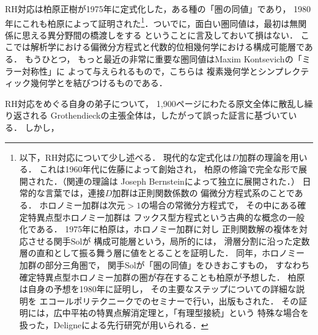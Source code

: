 \documentclass[9pt, a4paper, dvipdfmx]{jlreq}
\theoremstyle{definition}
\theoremstyle{mystyle}
\numberwithin{equation}{section} %
\begin{document}
RH対応は柏原正樹が1975年に定式化した，ある種の「圏の同値」であり，
1980年にこれも柏原によって証明された\footnote[26]{
    以下，RH対応について少し述べる．
    現代的な定式化は\(D\)加群の理論を用いる．
    これは1960年代に佐藤によって創始され，
    柏原の修論で完全な形で展開された．（関連の理論は
    Joseph Bernsteinによって独立に展開された．）
    日常的な言葉では，連接\(D\)加群は正則関数係数の
    偏微分方程式系のことである．
    ホロノミー加群は次元\(>1\)の場合の常微分方程式で，
    その中にある確定特異点型ホロノミー加群は
    フックス型方程式という古典的な概念の一般化である．
    1975年に柏原は，ホロノミー加群に対し
    正則関数解の複体を対応させる関手\(\mathrm{Sol}\)が
    構成可能層という，局所的には，
    滑層分割に沿った定数層の直和として振る舞う層に値をとることを証明した．
    同年，ホロノミー加群の部分三角圏で，
    関手\(\mathrm{Sol}\)が「圏の同値」をひきおこすもの，
    すなわち確定特異点型ホロノミー加群の圏が存在することも柏原が予想した．
    柏原は自身の予想を1980年に証明し，
    その主要なステップについての詳細な説明を
    エコールポリテクニークでのセミナーで行い，出版もされた．
    その証明には，広中平祐の特異点解消定理と，「有理型接続」という
    特殊な場合を扱った，Deligneによる先行研究が用いられる．
}．ついでに，面白い圏同値は，最初は無関係に思える異分野間の橋渡しをする
ということに言及しておいて損はない．
ここでは解析学における偏微分方程式と代数的位相幾何学における構成可能層である．
もうひとつ，
もっと最近の非常に重要な圏同値はMaxim Kontsevichの「ミラー対称性」に
よって与えられるもので，こちらは
複素幾何学とシンプレクティック幾何学とを結びつけるものである．

RH対応をめぐる自身の弟子について，
1,900ページにわたる原文全体に散乱し繰り返される
Grothendieckの主張全体は，したがって誤った証言に基づいている．
しかし，







%
%
\end{document}
